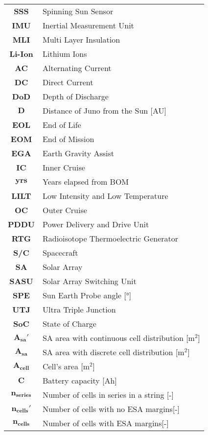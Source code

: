 \begin{multicols}{2}
{\begin{xltabular}{\linewidth}{c>{\raggedright\arraybackslash}X}
		\textbf{SSS} & Spinning Sun Sensor \\
		\textbf{IMU} & Inertial Measurement Unit \\
		\textbf{MLI} & Multi Layer Insulation \\
		\textbf{Li-Ion} & Lithium Ions \\
		\textbf{AC} & Alternating Current \\
		\textbf{DC} & Direct Current \\
		\textbf{DoD} & Depth of Discharge \\ 
		$\boldsymbol{D}$ & Distance of Juno from the Sun [AU] \\ 
		\textbf{EOL} & End of Life \\ 
		\textbf{EOM} & End of Mission \\ 
		\textbf{EGA} & Earth Gravity Assist \\ 
		\textbf{IC} & Inner Cruise \\
		$\boldsymbol{yrs}$ & Years elapsed from BOM \\
		\textbf{LILT} & Low Intensity and Low Temperature \\ 
		\textbf{OC} & Outer Cruise \\
		\textbf{PDDU} & Power Delivery and Drive Unit \\ 
		\textbf{RTG} & Radioisotope Thermoelectric Generator \\ 
		\textbf{S/C} & Spacecraft \\ 
		\textbf{SA} & Solar Array \\
		\textbf{SASU} & Solar Array Switching Unit \\ 
		\textbf{SPE} & Sun Earth Probe angle [°] \\ 
		\textbf{UTJ} & Ultra Triple Junction \\  
		\textbf{SoC} & State of Charge \\
		$\boldsymbol{A_{sa}'}$ & SA area with continuous cell distribution [$\textrm{m}^2$] \\
		$\boldsymbol{A_{sa}}$ & SA area with discrete cell distribution [$\textrm{m}^2$] \\
		$\boldsymbol{A_{cell}}$ & Cell's area [$\textrm{m}^2$] \\
		$\boldsymbol{C}$ & Battery capacity [Ah] \\
		$\boldsymbol{n_{series}}$ & Number of cells in series in a string [-] \\
		$\boldsymbol{n_{cells}'}$ & Number of cells with no ESA margins[-] \\
		$\boldsymbol{n_{cells}}$ & Number of cells with ESA margins[-] \\

\end{xltabular}}
\end{multicols}
